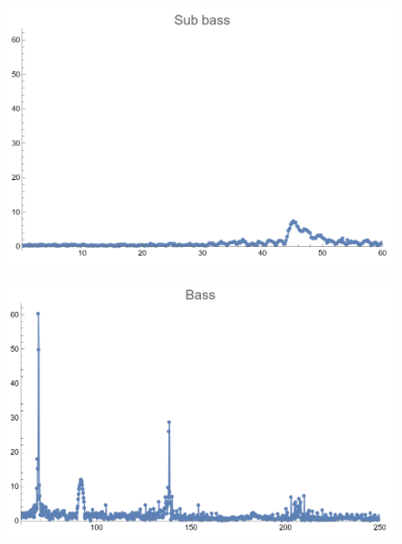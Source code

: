 \documentclass[12pt, letterpaper]{article}
\begin{document}
\begin{figure}[H]
  \centering
  \begin{minipage}{.5\textwidth}
    \centering
    \includegraphics[width=.9\linewidth]{imgs/Cancion9/subbass.png}
    \label{fig:09b}
  \end{minipage}%
  \begin{minipage}{.5\textwidth}
    \centering
    \includegraphics[width=.9\linewidth]{imgs/Cancion9/bass.png}
    \label{fig:09c}
  \end{minipage}
\end{figure}
\end{document}
